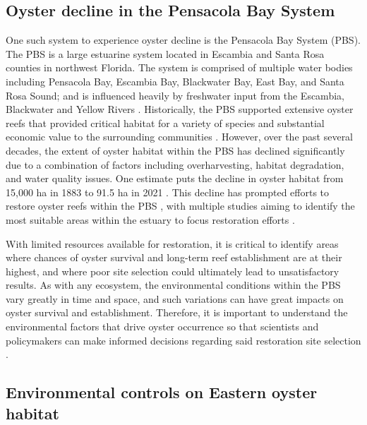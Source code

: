 \documentclass[
  review]{elsarticle}
\begin{document}
\subsection{Oyster decline in the Pensacola Bay
System}\label{oyster-decline-in-the-pensacola-bay-system}

One such system to experience oyster decline is the Pensacola Bay System
(PBS). The PBS is a large estuarine system located in Escambia and Santa
Rosa counties in northwest Florida. The system is comprised of multiple
water bodies including Pensacola Bay, Escambia Bay, Blackwater Bay, East
Bay, and Santa Rosa Sound; and is influenced heavily by freshwater input
from the Escambia, Blackwater and Yellow Rivers \citep{Christensen1997}.
Historically, the PBS supported extensive oyster reefs that provided
critical habitat for a variety of species and substantial economic value
to the surrounding communities \citep{Christensen1997}. However, over
the past several decades, the extent of oyster habitat within the PBS
has declined significantly due to a combination of factors including
overharvesting, habitat degradation, and water quality issues. One
estimate puts the decline in oyster habitat from 15,000 ha in 1883 to
91.5 ha in 2021 \citep{Geselbracht2024}. This decline has prompted
efforts to restore oyster reefs within the PBS
\citep{PPBEP_OysterRestoration, TNC2021OysterRestoration}, with multiple
studies aiming to identify the most suitable areas within the estuary to
focus restoration efforts
\citep{Geselbracht2024, Christensen1997, PPBEP_OysterRestoration}.

With limited resources available for restoration, it is critical to
identify areas where chances of oyster survival and long-term reef
establishment are at their highest, and where poor site selection could
ultimately lead to unsatisfactory results. As with any ecosystem, the
environmental conditions within the PBS vary greatly in time and space,
and such variations can have great impacts on oyster survival and
establishment. Therefore, it is important to understand the
environmental factors that drive oyster occurrence so that scientists
and policymakers can make informed decisions regarding said restoration
site selection \citep{Pollack2012, Barnes2007, Geselbracht2024}.

\subsection{Environmental controls on Eastern oyster
habitat}\label{environmental-controls-on-eastern-oyster-habitat}
\end{document}
